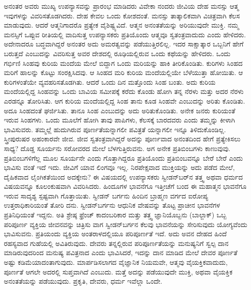 ಅನಂತರ ಅವರು ಮುಖ್ಯ ಉಪನ್ಯಾಸವನ್ನು ಪ್ರಾರಂಭ ಮಾಡಿದರು ವಿವೇಕಾ ನಂದರು ಜೀವಿಯ ದೇಹ ಮನಸ್ಸು ಆತ್ಮ ಇವುಗಳನ್ನು ವಿವರಿಸತೊಡಗಿದರು. ದೇಹ ಕೇವಲ ಒಂದು ಕೋಶದಂತೆ. ಮನಸ್ಸು ತಾತ್ಕಾಲಿಕವಾಗಿ ವಿಚಿತ್ರವಾಗಿ ಕೆಲಸ ಮಾಡುವುದು. ಆದರೆ ಆತ್ಮನಿಗಾದರೊ ಪ್ರತ್ಯೇಕ ವೈಶಿಷ್ಟ್ಯವಿದೆ. ಆತ್ಮನ ಅನಂತತೆಯನ್ನು ಅರಿಯುವುದೇ ಮುಕ್ತಿ. ನಮ್ಮ ಮನಸ್ಸಿಗೆ ಒಪ್ಪುವ ರೀತಿಯಲ್ಲಿ ವಾದಿಸುತ್ತ ಉಪನ್ಯಾಸಕರು ಪ್ರತಿಯೊಂದು ಆತ್ಮವೂ ಸ್ವತಂತ್ರವಾದುದು ಎಂದು ಹೇಳಿದರು. ಅದೇನಾದರೂ ಬದ್ಧವಾಗಿದ್ದರೆ ಅನಂತರ ಅದು ಅಮರತ್ವವನ್ನು ಪಡೆಯುತ್ತಿರಲಿಲ್ಲ. ಇದರ ಸಾಕ್ಷಾತ್ಕಾರ ಒಬ್ಬನಿಗೆ ಹೇಗೆ ಬರುತ್ತದೆ ಎಂಬುದನ್ನು ವಿವರಿಸುತ್ತ ಅವರ ದೇಶದಲ್ಲಿ ರೂಢಿಯಲ್ಲಿರುವ ಒಂದು ಕಥೆಯನ್ನು ಹೇಳಿದರು. ಒಂದು ಗರ್ಭಿಣಿ ಸಿಂಹವು ಕುರಿಯ ಮಂದೆಯ ಮೇಲೆ ಬಿದ್ದಾಗ ಒಂದು ಮರಿಯನ್ನು ಹಾಕಿ ತೀರಿಕೊಂಡಿತು. ಕುರಿಗಳು ಸಿಂಹದ ಮರಿಗೆ ಹಾಲನ್ನು ಕೊಟ್ಟು ಸಂರಕ್ಷಿಸಿದವು. ಆ ಸಿಂಹದ ಮರಿ ಕುರಿಯ ಮಂದೆಯಲ್ಲಿಯೇ ಬೆಳೆಯುತ್ತಾ ಹೋಯಿತು. ಆ ಕುರಿಗಳಂತೆಯೇ ವ್ಯವಹರಿಸತೊಡಗಿತು. ಆದರೆ ಒಂದು ದಿನ ಮತ್ತೊಂದು ಸಿಂಹ ಬಂತು. ಅದು ಕುರಿಯ ಮಂದೆಯಲ್ಲಿದ್ದ ಸಿಂಹವನ್ನು ಒಂದು ಬಾವಿಯ ಸಮೀಪಕ್ಕೆ ಕರೆದು ಕೊಂಡು ಹೋಗಿ ತನ್ನ ನೆರಳು ಮತ್ತು ಅದರ ನೆರಳು ಎರಡನ್ನೂ ತೋರಿಸಿತು. ಆಗ ಕುರಿಯ ಮಂದೆಯಲ್ಲಿದ್ದ ಸಿಂಹ ತಾನು ಕೂಡ ಸಿಂಹವೇ ಎಂಬುದನ್ನು ಅರಿತು ಕೊಂಡಿತು. ಅದೂ ಸಿಂಹದಂತೆ ಘರ್ಜಿಸಿತು. ತಾನೂ ಸಿಂಹ ಎಂಬುದನ್ನು ಅದು ಅರಿತುಕೊಂಡಿತು. ಅನೇಕ ಜನರು ಕುರಿಯಂತೆ ಇರುವ ಸಿಂಹಗಳು. ಒಂದು ಮೂಲೆಗೆ ಹೋಗಿ ತಾವು ಪಾಪಿಗಳು, ಕೆಲಸಕ್ಕೆ ಬಾರದವರು ಎಂದು ತಮ್ಮನ್ನು ಕೀಳಾಗಿ ಭಾವಿಸುವರು. ತಮ್ಮಲ್ಲೆ ಹುದುಗಿರುವ ಪೂರ್ಣತೆಯನ್ನಾಗಲೀ ಪವಿತ್ರತೆ ಯನ್ನಾಗಲೀ ಇನ್ನೂ ತಿಳಿದುಕೊಂಡಿಲ್ಲ. ಸ್ತ್ರೀಪುರುಷರ ಅಹಂಕಾರವೇ ಜೀವ. ಜೀವ ಸ್ವತಂತ್ರವಾಗಿದ್ದರೆ ಅದನ್ನು ಪೂರ್ಣವಾದ ಅನಂತದಿಂದ ಹೇಗೆ ಪ್ರತ್ಯೇಕಿಸಲು ಸಾಧ್ಯ? ದೊಡ್ಡ ಸೂರ್ಯನು ಸರೋವರದ ಮೇಲೆ ಬೆಳಗುತ್ತಿರುವನು. ಅಗ ಅನೇಕ ಪ್ರತಿಬಿಂಬಗಳು ಕಾಣುವುವು. ಪ್ರತಿಬಿಂಬಗಳಿಗೆಲ್ಲ ಮೂಲ ಸೂರ್ಯನೇ ಎಂದು ಗೊತ್ತಾಗಿದ್ದರೂ ಪ್ರತಿಯೊಂದು ಪ್ರತಿಬಿಂಬವನ್ನೂ ಬೇರೆ ಬೇರೆ ಎಂದು ಭಾವಿಸು ವಂತೆ ಇದೆ ಇದು. ಜೀವಿಗೆ ಯಾವ ಲಿಂಗವೂ ಇಲ್ಲ. ನಿರಪೇಕ್ಷವಾದ ಮುಕ್ತಿಯನ್ನು ಅದು ಪಡೆದ ಮೇಲೆ, ದೈಹಿಕವಾದ ಲೈಂಗಿಕತೆಯಿಂದ ಅದಕ್ಕೇನು? ಈ ವಿಷಯದಲ್ಲಿ ಉಪನ್ಯಾಸಕರು ಸ್ವೀಡನ್​ಬರ್​ನ ತತ್ತ್ವ ಅಥವಾ ಧರ್ಮದ ವಿಷಯವನ್ನೂ ಕೂಲಂಕುಷವಾಗಿ ವಿವರಿಸಿದರು. ಹಿಂದೂಗಳ ಭಾವನೆಗೂ ಇತ್ತೀಚೆಗೆ ಬಂದ ಈ ಮಹಾತ್ಮನ ಭಾವನೆಗೂ ಇರುವ ಸಾದೃಶ್ಯ ಸ್ಪಷ್ಟವಾಗಿ ಗೊತ್ತಾಯಿತು. ಸ್ವೀಡನ್​ ಬರ್ಗನು ಹಿಂದಿನ ಬ್ರಾಹ್ಮಣ ವರ್ಗದ ಐರೋಪ್ಯ ಉತ್ತರಾಧಿಕಾರಿಯಂತೆ ತೋರಿ ದನು. ಸ್ವೀಡನ್​ಬರ್ಗನು ಆಧುನಿಕ ವೇಷವನ್ನು ತೊಟ್ಟ ಪ್ರಾಚೀನ ಭಾವನೆಗಳ ಪ್ರತಿನಿಧಿಯಂತೆ ಇದ್ದನು. ಅತಿ ಶ್ರೇಷ್ಠ ಫ್ರೆಂಚ್​ ಕಾದಂಬರಿಕಾರ ಮತ್ತು ತತ್ತ್ವ ಜ್ಞಾನಿಯೊಬ್ಬನು (ಬಾಲ್ಜಾಕ್​) ಒಬ್ಬ ಪರಿಪೂರ್ಣ ವ್ಯಕ್ತಿಯ ಜೀವನವನ್ನು ಚಿತ್ರಿಸು ವಾಗ ಸ್ವೀಡನ್​ಬರ್ಗನ ಕೆಲವು ಭಾವನೆಯನ್ನು ಸೇರಿಸುವುದು ಯೋಗ್ಯವೆಂದು ಭಾವಿಸುವನು. ಪ್ರತಿಯಂದು ವ್ಯಕ್ತಿಯ ಅಂತರಾಳದಲ್ಲಿಯೂ ಪರಿಪೂರ್ಣತೆ ಇದೆ. ಅದು ಅವನ ದೇಹದ ಹಿಂದೆ ರಹಸ್ಯವಾದ ಗುಹೆಯಲ್ಲಿ ಅವಿತಿರುವುದು. ದೇವರು ತನ್ನಲ್ಲಿರುವ ಪರಿಪೂರ್ಣತೆಯನ್ನು ಮನುಷ್ಯನಿಗೆ ಸ್ವಲ್ಪ ದಾನ ಮಾಡಿರುವುದರಿಂದ ಮನುಷ್ಯ ಪವಿತ್ರನಾದ ಎಂದು ಭಾವಿಸಿದರೆ, ಇದನ್ನು ದಾನ ಮಾಡಿದ ಮೇಲೆ ದೇವರ ಪೂರ್ಣತೆ ಅಷ್ಟು ಕಡಿಮೆಯಾದಂತಾಗುವುದು. ಮಾರ್ಪಡಿಸಲಾಗದ ವೈಜ್ಞಾನಿಕ ನಿಯಮವೇ, ಆತ್ಮವು ವೈಯಕ್ತಿಕವಾದುದು, ಪೂರ್ಣತೆ ಆಗಲೇ ಅದರಲ್ಲಿ ಸುಪ್ತವಾಗಿದೆ ಎಂಬುದು. ಮತ್ತೆ ಅದನ್ನು ಪಡೆಯುವುದೇ ಮುಕ್ತಿ, ಅಥವಾ ವೈಯಕ್ತಿಕ ಅನಂತತೆಯನ್ನು ಪಡೆಯುವುದು. ಪ್ರಕೃತಿ, ದೇವರು, ಧರ್ಮ ಇವೆಲ್ಲಾ ಒಂದೇ.

